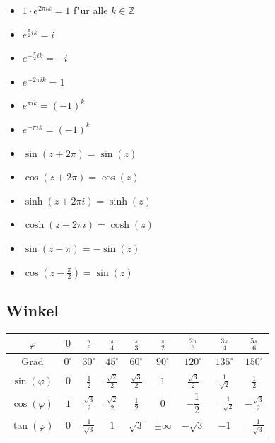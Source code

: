 \begin{minipage}{0.49\linewidth}

\begin{itemize}
	\item \(1\cdot e^{2\pi i k} = 1\) f"ur alle \(k \in \mathbb{Z}\)
	\item	\(e^{\frac{\pi}{2} i k} = i\)
	\item \(e^{-\frac{\pi}{2} i k} = -i\)
	\item \(e^{-2 \pi i k} = 1\)
	\item \(e^{\pi i k} = (-1)^k\)
	\item \(e^{-\pi i k} = (-1)^k\)
\end{itemize}	

\end{minipage}
\hfill
\begin{minipage}{0.49\linewidth}
\begin{itemize}	
	\item $ \sin(z+2 \pi) = \sin(z) $
	\item $ \cos(z+2 \pi) = \cos(z) $
	\item $\sinh(z + 2 \pi i) = \sinh(z)$
	\item $\cosh(z + 2 \pi i) = \cosh(z)$
	\item $ \sin(z- \pi) = -\sin(z) $
	\item $ \cos(z- \frac{\pi}{2}) = \sin(z) $
\end{itemize}
\end{minipage}
\subsection{Winkel}
\renewcommand{\arraystretch}{1.5}
\begin{tabular}{|c|c|c|c|c|c|c|c|c|}
	\hline
	\(\varphi \) &$0$ & \(\frac{\pi}{6}\) & \(\frac{\pi}{4}\) & \(\frac{\pi}{3}\) &  \(\frac{\pi}{2}\) &  \(\frac{2\pi}{3}\) &  \(\frac{3\pi}{4}\) & \(\frac{5\pi}{6}\) \\
	\hline
	Grad & $0^\circ$ & $30^\circ$ & $45^\circ$ & $60^\circ$ & $90^\circ$ & $ 120^\circ$ & $135^\circ$ & $150^\circ$\\
	\hline
	\(\sin(\varphi)\) & $0$ & \(\frac{1}{2}\) & \(\frac{\sqrt{2}}{2}\) & \(\frac{\sqrt{3}}{2}\) & $1$ &  \(\frac{\sqrt{3}}{2}\) &  \(\frac{1}{\sqrt{2}}\) &  \(\frac{1}{2}\)   \\
	\hline
	\(\cos(\varphi)\) &$1$ & \(\frac{\sqrt{3}}{2}\) & \(\frac{\sqrt{2}}{2}\) & \(\frac{1}{2}\) & $0$ & $-\dfrac{1}{2}$ & \(-\frac{1}{\sqrt{2}}\) &  \(-\frac{\sqrt{3}}{2}\)  \\
	\hline
	\(\tan(\varphi)\) &$ 0$ & \(\frac{1}{\sqrt{3}}\) &  $1$ & $\sqrt{3}$ & $\pm \infty$ &$-\sqrt{3}$ & $-1$ &  \(-\frac{1}{\sqrt{3}}\)\\ 
	\hline
\end{tabular}\\


